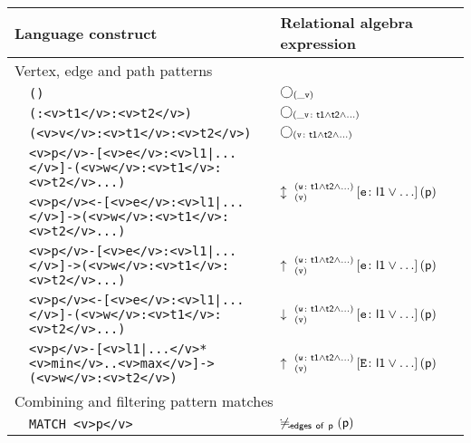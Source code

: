 \setlength\extrarowheight{2.5pt}
\setlength\tabcolsep{3.6pt}
\begin{table}[htbp]
	\centering
	\begin{tabular}{|l|l|l|}
		\hline
		\multicolumn{2}{|l|}{ \bf Language construct } & \bf Relational algebra expression \\ \hline\hline

		\multicolumn{3}{|l|}{Vertex, edge and path patterns } \\ \cline{2-3}

		& \lstinline+()+ & $\getvertices{\_v}{}$ \\ \cline{2-3}

		& \lstinline+(:<v>t1</v>:<v>t2</v>)+ & $\getvertices{\_v}{t1 \land t2 \land \ldots}$ \\ \cline{2-3}

		& \lstinline+(<v>v</v>:<v>t1</v>:<v>t2</v>)+ & $\getvertices{v}{t1 \land t2 \land \ldots}$ \\ \cline{2-3}

		& \lstinline+<v>p</v>-[<v>e</v>:<v>l1|...</v>]-(<v>w</v>:<v>t1</v>:<v>t2</v>...)+ & \multirow{2}{*}{$\expandboth{v}{w}{t1 \land t2 \land \ldots}{e}{l1 \lor \ldots} (\atom{p})$} \\ \cline{2-2}
		& \lstinline+<v>p</v><-[<v>e</v>:<v>l1|...</v>]->(<v>w</v>:<v>t1</v>:<v>t2</v>...)+ & \\ \cline{2-3}

		& \lstinline+<v>p</v>-[<v>e</v>:<v>l1|...</v>]->(<v>w</v>:<v>t1</v>:<v>t2</v>...)+ & $\expandout{v}{w}{t1 \land t2 \land \ldots}{e}{l1 \lor \ldots} (\atom{p})$ \\ \cline{2-3}

		& \lstinline+<v>p</v><-[<v>e</v>:<v>l1|...</v>]-(<v>w</v>:<v>t1</v>:<v>t2</v>...)+ & $\expandin{v}{w}{t1 \land t2 \land \ldots}{e}{l1 \lor \ldots} (\atom{p})$ \\ \cline{2-3}

		& \lstinline+<v>p</v>-[<v>l1|...</v>*<v>min</v>..<v>max</v>]->(<v>w</v>:<v>t2</v>)+ & $\expandout{v}{w}{t1 \land t2 \land \ldots}{E}{l1 \lor \ldots}(\atom{p})$ \\ \cline{2-3}

		\hline \multicolumn{3}{|l|}{Combining and filtering pattern matches } \\ \cline{2-3}

		& \lstinline+MATCH <v>p</v>+ & $\not\fallingdotseq_{\mathsf{\mathsf{edges~of~p}}} \left(\mathsf{p}\right)$ \\ \cline{2-3}


\end{tabular}
\end{table}
